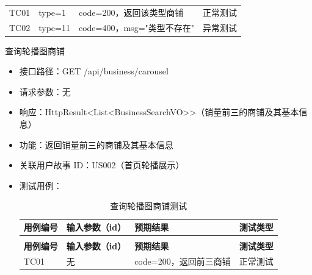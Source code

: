 \begin{levellist}
\begin{levellist}
\begin{itemize}
\begin{longtable}{>{\centering\arraybackslash}m{1.7cm} >{\centering\arraybackslash}m{4cm} >{\centering\arraybackslash}m{5.5cm} >{\centering\arraybackslash}m{1.8cm}}
                      \bottomrule
                      \endfoot

                      TC01          & type=1            & code=200，返回该类型商铺     & 正常测试          \\
                      TC02          & type=11           & code=400，msg="类型不存在" & 异常测试          \\
                  \end{longtable}
        \end{itemize}

        \item 查询轮播图商铺
        \begin{itemize}
            \item 接口路径：GET /api/business/carousel
            \item 请求参数：无
            \item 响应：HttpResult<List<BusinessSearchVO>>（销量前三的商铺及其基本信息）
            \item 功能：返回销量前三的商铺及其基本信息
            \item 关联用户故事 ID：US002（首页轮播展示）
            \item 测试用例：
                  \begin{longtable}{>{\centering\arraybackslash}m{2cm} >{\centering\arraybackslash}m{4cm} >{\centering\arraybackslash}m{5cm} >{\centering\arraybackslash}m{2cm}}

                      \caption{查询轮播图商铺测试} \label{tab:training}                            \\

                      \toprule
                      \textbf{用例编号} & \textbf{输入参数（id）} & \textbf{预期结果}   & \textbf{测试类型} \\
                      \midrule
                      \endfirsthead

                      \multicolumn{4}{c}{{\tablename\ \thetable{} 续表}}                    \\
                      \toprule
                      \textbf{用例编号} & \textbf{输入参数（id）} & \textbf{预期结果}   & \textbf{测试类型} \\
                      \midrule
                      \endhead

                      \bottomrule
                      \endfoot


                      TC01          & 无                 & code=200，返回前三商铺 & 正常测试          \\
                  \end{longtable}
        \end{itemize}


\end{levellist}
\end{levellist}
